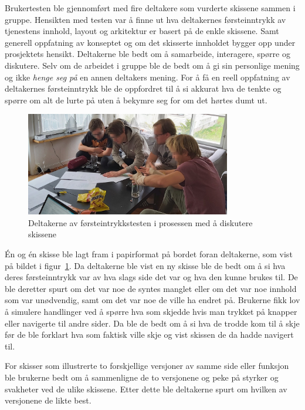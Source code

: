 Brukertesten ble gjennomført med fire deltakere som vurderte skissene sammen i gruppe. Hensikten med testen var å finne ut hva deltakernes førsteinntrykk av tjenestens innhold, layout og arkitektur er basert på de enkle skissene. Samt generell oppfatning av konseptet og om det skisserte innholdet bygger opp under prosjektets hensikt. Deltakerne ble bedt om å samarbeide, interagere, spørre og diskutere. Selv om de arbeidet i gruppe ble de bedt om å gi sin personlige mening og ikke {\em henge seg på} en annen deltakers mening. For å få en reell oppfatning av deltakernes førsteinntrykk ble de oppfordret til å si akkurat hva de tenkte og spørre om alt de lurte på uten å bekymre seg for om det hørtes dumt ut.


\begin{figure}[H]
\includegraphics[width=0.8\textwidth]{Illustrasjoner/skissetest-bilde.jpg}
\centering
\caption{Deltakerne av førsteintrykkstesten i prosessen med å diskutere skissene}
\label{fig:skissetest}
\end{figure}

Én og én skisse ble lagt fram i papirformat på bordet foran deltakerne, som vist på bildet i figur~\ref{fig:skissetest}. Da deltakerne ble vist en ny skisse ble de bedt om å si hva deres førsteinntrykk var av hva slags side det var og hva den kunne brukes til. De ble deretter spurt om det var noe de syntes manglet eller om det var noe innhold som var unødvendig, samt om det var noe de ville ha endret på. Brukerne fikk lov å simulere handlinger ved å spørre hva som skjedde hvis man trykket på knapper eller navigerte til andre sider. Da ble de bedt om å si hva de trodde kom til å skje før de ble forklart hva som faktisk ville skje og vist skissen de da hadde navigert til.

For skisser som illustrerte to forskjellige versjoner av samme side eller funksjon ble brukerne bedt om å sammenligne de to versjonene og peke på styrker og svakheter ved de ulike skissene. Etter dette ble deltakerne spurt om hvilken av versjonene de likte best.

